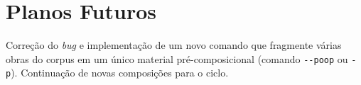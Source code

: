 \section{Planos Futuros}\label{sec:planos}

Correção do \emph{bug} e implementação de um novo comando que fragmente várias obras do corpus em um único material pré-composicional (comando \verb|--poop| ou \verb|-p|). Continuação de novas composições para o ciclo.